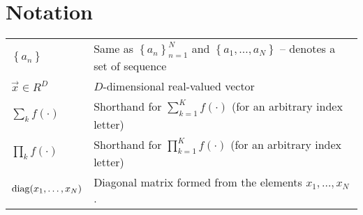 \chapter{Notation}
\begin{tabular}{ll}
    $\left\{a_n\right\}$                & Same as $\left\{a_n\right\}_{n = 1}^N$ and $\left\{a_1, \dotsc, a_N\right\}$ -- denotes a set of sequence \\
    $\vec x \in R^D$                    & $D$-dimensional real-valued vector \\
    $\sum_k f(\cdot)$                   & Shorthand for $\sum_{k = 1}^K f(\cdot)$ (for an arbitrary index letter) \\
    $\prod_k f(\cdot)$                  & Shorthand for $\prod_{k = 1}^K f(\cdot)$ (for an arbitrary index letter) \\
    $\operatorname{diag}(x_1, \dotsc, x_N)$           & Diagonal matrix formed from the elements $x_1, \dotsc, x_N$.
\end{tabular}